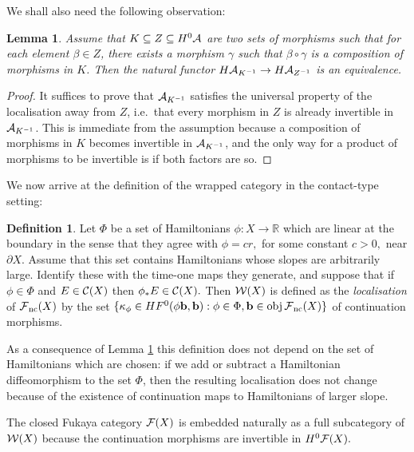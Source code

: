 \documentclass{article}
\theoremstyle{plain}%
\newtheorem{lem}[thm]{Lemma}
\theoremstyle{definition}
\newtheorem{dfn}[thm]{Definition}
\numberwithin{equation}{section}
\numberwithin{figure}{section}
\def\cA{{\mathbin{\cal A}}}
\def\cC{{\mathbin{\cal C}}}
\def\cF{{\mathbin{\cal F}}}
\def\cW{{\mathbin{\cal W}}}
\def\R{{\mathbin{\mathbb R}}}
\def\ka{\kappa}
\def\ph{\phi}
\def\Ph{\Phi}
\def\d{{\partial}}
\def\sb{\subseteq}
\begin{document}
We shall also need the following observation:
\begin{lem} \label{lem:localisation_does_not_change}
  Assume that $K \sb Z\sb H^0\cA$ are two sets of morphisms such that for each element $\beta \in Z$, there exists  a morphism $\gamma$ such that $\beta \circ \gamma$ is a composition of morphisms in $K$. 
  Then the natural functor $H\cA_{K^{-1}} \to H\cA_{Z^{-1}}$ is an equivalence.
\end{lem}
\begin{proof}
  It suffices to prove that $ \cA_{K^{-1}} $ satisfies the universal property of the localisation away from $Z$, i.e.\ that every morphism in $Z$ is already invertible in $ \cA_{K^{-1}} $. This is immediate from the assumption because a composition of morphisms in $K$ becomes invertible  in $ \cA_{K^{-1}} $, and the only way for a product of morphisms to be invertible is if both factors are so.
\end{proof}


We now arrive at the definition of the wrapped category in the contact-type setting:
\begin{dfn}\label{localisation}
Let $\Ph$ be a set of Hamiltonians $\ph:X\to\R$ which are linear at the boundary in the sense that they agree with  $\ph=cr,$ for some constant $c>0,$ near $\d X$. Assume that this set contains Hamiltonians whose slopes are arbitrarily large.
Identify these with the time-one maps they generate, and suppose that if $\ph\in\Ph$ and $E\in \cC(X)$ then $\ph_*E \in\cC(X).$
Then $\cW(X)$ is defined as the {\it localisation} of $\cF_\nc(X)$ by the set
$\{\ka_\ph\in HF^0(\ph\b,\b):\ph\in\Ph, \b\in \obj\cF_\nc(X)\}$
of continuation morphisms.
\end{dfn}

As a consequence of Lemma \ref{lem:localisation_does_not_change} this definition does not depend on the set of Hamiltonians which are chosen: if we add or subtract a Hamiltonian diffeomorphism to the set $\Phi$, then the resulting localisation does not change because of the existence of continuation maps to Hamiltonians of larger slope. 

The closed Fukaya category $\cF(X)$ is embedded naturally as a full subcategory of $\cW(X)$
because the continuation morphisms are invertible in $H^0\cF(X).$ 

\end{document}
